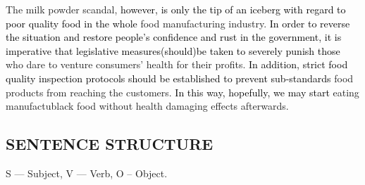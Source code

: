 \documentclass{article}
\begin{document}
\par The milk powder scandal, \textcolor{black}{however, is only the tip of an iceberg with
  regard to poor quality food in the whole} food manufacturing
industry. \textcolor{black}{In order to reverse the situation and restore people's
  confidence and rust in the government, it is imperative that legislative
  measures(should)be taken to severely punish those} who dare to venture consumers' health
for their profits. \textcolor{black}{In addition, strict food quality inspection protocols
  should be established to prevent sub-standards} food products from reaching the
customers. \textcolor{black}{In this way, hopefully, we may start} eating manufactublack food
without health damaging effects afterwards.


\begin{center}
  \section{SENTENCE STRUCTURE}
\end{center}
\label{sec:sentence}
S --- Subject, V --- Verb, O -- Object.
\end{document}
